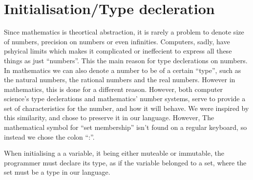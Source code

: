 \section{Initialisation/Type decleration}

Since mathematics is theortical abstraction, it is rarely a problem to denote size of numbers, precision on numbers or even infinities. Computers, sadly, have pshyical limits which makes it complicated or ineffecient to express all these things as just \enquote{numbers}. This the main reason for type declerations on numbers. In mathematics we can also denote a number to be of a certain \enquote{type}, such as the natural numbers, the rational numbers and the real numbers. However in mathematics, this is done for a different reason. However, both computer science's type declerations and mathematics' number systems, serve to provide a set of characteristics for the number, and how it will behave. We were inspired by this similarity, and chose to preserve it in our language. However, The mathematical symbol for \enquote{set membership} isn't found on a regular keyboard, so instead we chose the colon \enquote{:}.

When initialising a a variable, it being either muteable or immutable, the programmer must declare its type, as if the variable belonged to a set, where the set must be a type in our language.